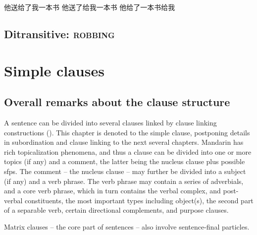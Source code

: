 \documentclass[UTF8, a4paper, oneside, scheme=plain, 12pt]{ctexrep}
\newcommand*{\category}[1]{\textsc{#1}}
\begin{document}
\begin{exe}
    \ex 他送给了我一本书
    \ex 他送了给我一本书
    \ex 他给了一本书给我
    \ex 
\end{exe}

\section{Ditransitive: \category{robbing}}

\chapter{Simple clauses}\label{chap:simple-clause}

\section{Overall remarks about the clause structure}

A sentence can be divided into several clauses linked by clause linking constructions 
().
This chapter is denoted to the simple clause,
postponing details in subordination and clause linking to the next several chapters.
Mandarin has rich topicalization phenomena,
and thus a clause can be divided into
one or more topics (if any) and a comment,
the latter being the nucleus clause
plus possible \acl{sfp}s.
The comment -- the nucleus clause -- may further be divided into a subject (if any)
and a verb phrase. 
The verb phrase may contain 
a series of adverbials, 
and a core verb phrase, which in turn contains
the verbal complex, and post-verbal constituents,
the most important types including object(s), 
the second part of a separable verb,
certain directional complements,
and purpose clauses.

Matrix clauses -- the core part of sentences -- 
also involve sentence-final particles. 
\end{document}
